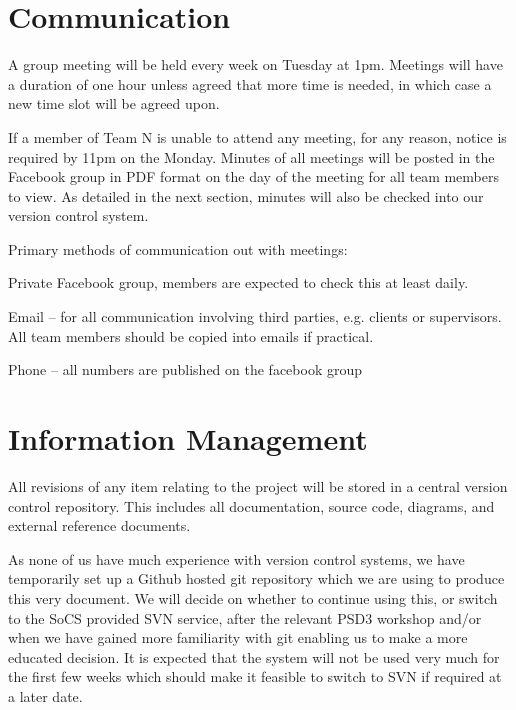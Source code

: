 \documentclass{l3deliverable}
\begin{document}



\section{Communication}

A group meeting will be held every week on Tuesday at 1pm. Meetings will have a duration of one hour unless agreed that more time is needed, in which case a new time slot will be agreed upon.

If a member of Team N is unable to attend any meeting, for any reason, notice is required by 11pm on the Monday. Minutes of all meetings will be posted in the Facebook group in PDF format on the day of the meeting for all team members to view. As detailed in the next section, minutes will also be checked into our version control system.

Primary methods of communication out with meetings:
\begin{list}{}{}
\item Private Facebook group, members are expected to check this at least daily.
\item Email -- for all communication involving third parties, e.g. clients or supervisors. All team members should be copied into emails if practical.
\item Phone -- all numbers are published on the facebook group
\end{list}


\section{Information Management}

All revisions of any item relating to the project will be stored in a central version control repository. This includes all documentation, source code, diagrams, and external reference documents.

As none of us have much experience with version control systems, we have temporarily set up a Github hosted git repository which we are using to produce this very document. We will decide on whether to continue using this, or switch to the SoCS provided SVN service, after the relevant PSD3 workshop and/or when we have gained more familiarity with git enabling us to make a more educated decision. It is expected that the system will not be used very much for the first few weeks which should make it feasible to switch to SVN if required at a later date.
\end{document}
